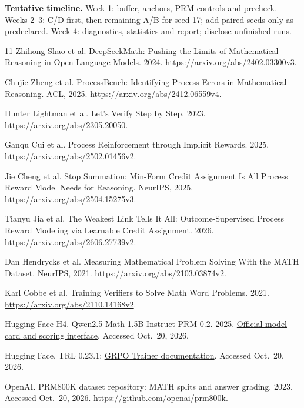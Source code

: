 \documentclass{article}
\begin{document}
\textbf{Tentative timeline.} Week 1: buffer, anchors, PRM controls and precheck. Weeks 2--3: C/D first, then remaining A/B for seed 17; add paired seeds only as predeclared. Week 4: diagnostics, statistics and report; disclose unfinished runs.
\clearpage
\begin{thebibliography}{11}
Zhihong Shao et al. DeepSeekMath: Pushing the Limits of Mathematical Reasoning in Open Language Models. 2024.
\url{https://arxiv.org/abs/2402.03300v3}.

Chujie Zheng et al. ProcessBench: Identifying Process Errors in Mathematical Reasoning. ACL, 2025.
\url{https://arxiv.org/abs/2412.06559v4}.

Hunter Lightman et al. Let's Verify Step by Step. 2023.
\url{https://arxiv.org/abs/2305.20050}.

Ganqu Cui et al. Process Reinforcement through Implicit Rewards. 2025.
\url{https://arxiv.org/abs/2502.01456v2}.

Jie Cheng et al. Stop Summation: Min-Form Credit Assignment Is All Process Reward Model Needs for Reasoning. NeurIPS, 2025.
\url{https://arxiv.org/abs/2504.15275v3}.

Tianyu Jia et al. The Weakest Link Tells It All: Outcome-Supervised Process Reward Modeling via Learnable Credit Assignment. 2026.
\url{https://arxiv.org/abs/2606.27739v2}.

Dan Hendrycks et al. Measuring Mathematical Problem Solving With the MATH Dataset. NeurIPS, 2021.
\url{https://arxiv.org/abs/2103.03874v2}.

Karl Cobbe et al. Training Verifiers to Solve Math Word Problems. 2021.
\url{https://arxiv.org/abs/2110.14168v2}.

Hugging Face H4. Qwen2.5-Math-1.5B-Instruct-PRM-0.2. 2025.
\href{https://huggingface.co/HuggingFaceH4/Qwen2.5-Math-1.5B-Instruct-PRM-0.2}{Official model card and scoring interface}. Accessed Oct.\ 20, 2026.

Hugging Face. TRL 0.23.1: \href{https://huggingface.co/docs/trl/v0.23.1/grpo_trainer}{GRPO Trainer documentation}. Accessed Oct.\ 20, 2026.

OpenAI. PRM800K dataset repository: MATH splits and answer grading. 2023. Accessed Oct.\ 20, 2026.
\url{https://github.com/openai/prm800k}.
\end{thebibliography}
\end{document}
